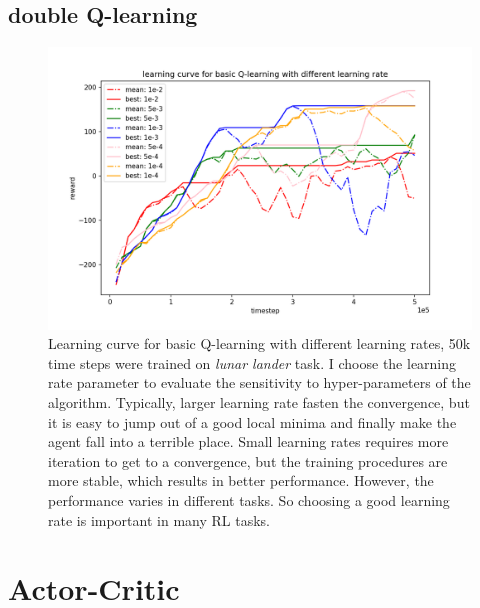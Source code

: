 \documentclass[12pt]{article}
\begin{document}
\subsection{double Q-learning}
\begin{figure}[!h]
\centering
\includegraphics[width=6in]{Figure_3.png}
\caption{Learning curve for basic Q-learning with different learning rates, 50k time steps were trained on \textit{lunar lander} task. I choose the learning rate parameter to evaluate the sensitivity to hyper-parameters of the algorithm. Typically, larger learning rate fasten the convergence, but it is easy to jump out of a good local minima and finally make the agent fall into a terrible place. Small learning rates requires more iteration to get to a convergence, but the training procedures are more stable, which results in better performance. However, the performance varies in different tasks. So choosing a good learning rate is important in many RL tasks.}
\end{figure}

\newpage
\section{Actor-Critic}
\end{document}
